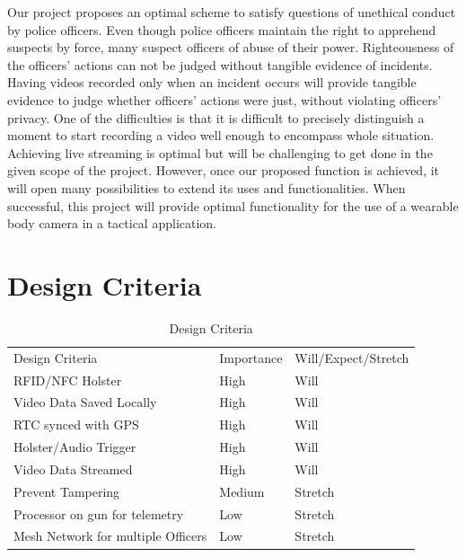 \documentclass[12pt]{article}
\begin{document}
Our project proposes an optimal scheme to satisfy questions of unethical
conduct by police officers. Even though police officers maintain the right to
apprehend suspects by force, many suspect officers of abuse of their power.
Righteousness of the officers’ actions can not be judged without tangible
evidence of incidents. Having videos recorded only when an incident occurs will
provide tangible evidence to judge whether officers’ actions were just, without
violating officers’ privacy. One of the difficulties is that it is difficult to
precisely distinguish a moment to start recording a video well enough to
encompass whole situation. Achieving live streaming is optimal but will be
challenging to get done in the given scope of the project. However, once our
proposed function is achieved, it will open many possibilities to extend its
uses and functionalities. When successful, this project will provide optimal
functionality for the use of a wearable body camera in a tactical application. 

\newpage




\newpage

\appendix
\section{Design Criteria}

\begin{table}[h!]
    \centering
    \caption{Design Criteria}
    \begin{tabular}{lll}
        Design Criteria & Importance & Will/Expect/Stretch\\
        RFID/NFC Holster & High & Will\\
        Video Data Saved Locally & High & Will\\
        RTC synced with GPS & High & Will\\
        Holster/Audio Trigger & High & Will\\
        Video Data Streamed & High & Will\\
        Prevent Tampering & Medium & Stretch\\
        Processor on gun for telemetry & Low & Stretch\\
        Mesh Network for multiple Officers & Low & Stretch\\
    \end{tabular}
\end{table}
\end{document}
